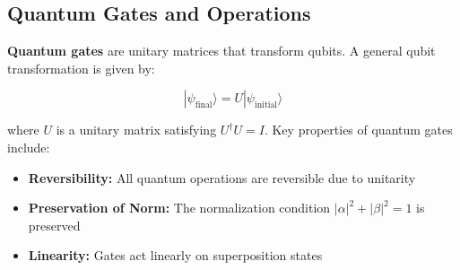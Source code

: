 \subsection*{Quantum Gates and Operations} 

\textbf{Quantum gates} are unitary matrices that transform qubits. A general
qubit transformation is given by:

\[
  |\psi_{\text{final}}\rangle = U |\psi_{\text{initial}}\rangle
\]

\noindent
where $U$ is a unitary matrix satisfying $U^\dagger U = I$. Key properties of
quantum gates include:


\begin{itemize}
  \item \textbf{Reversibility:} All quantum operations are reversible due
    to unitarity

  \item \textbf{Preservation of Norm:} The normalization condition
    $|\alpha|^2 + |\beta|^2 = 1$ is preserved

  \item \textbf{Linearity:} Gates act linearly on superposition states

\end{itemize}

